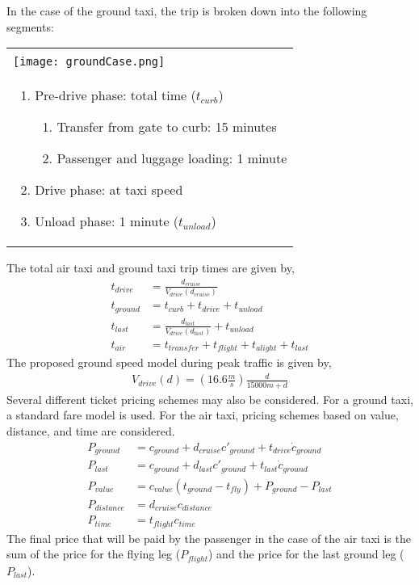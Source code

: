 \documentclass[12pt, letter]{article}
\begin{document}
\noindent In the case of the ground taxi, the trip is broken down into the following segments:
\begin{table}[H]
	\begin{tabular}{|p{5in}|}
	\hline
		\\\texttt{[image: groundCase.png]}\\
		\begin{enumerate}
			\item Pre-drive phase: total time ($t_{curb}$)
			\begin{enumerate}
			  \item Transfer from gate to curb: 15 minutes
				\item Passenger and luggage loading: 1 minute
			\end{enumerate}
			\item Drive phase: at taxi speed
			\item Unload phase: 1 minute ($t_{unload}$)
		\end{enumerate}
		\\ \hline
	\end{tabular}
\end{table}
\noindent The total air taxi and ground taxi trip times are given by,
\begin{align}
	t_{drive}&=\frac{d_{cruise}}{V_{drive}\left(d_{cruise}\right)}\\
	t_{ground}&=t_{curb}+t_{drive}+t_{unload}\\
	t_{last}&=\frac{d_{last}}{V_{drive}\left(d_{last}\right)}+t_{unload}\\
	t_{air}&=t_{transfer}+t_{flight}+t_{alight}+t_{last}
\end{align}
The proposed ground speed model during peak traffic is given by,
\begin{align}
	V_{drive}(d)=\left(16.6\frac{m}{s}\right)\frac{d}{15000m+d}
\end{align}
Several different ticket pricing schemes may also be considered. For a ground taxi, a standard fare model is used. For the air taxi, pricing schemes based on value, distance, and time are considered.
\begin{align}
	P_{ground}&=c_{ground}+d_{cruise} c'_{ground}+t_{drive} \dot{c}_{ground}\\
	P_{last}&=c_{ground}+d_{last} c'_{ground}+t_{last} \dot{c}_{ground}\\
	P_{value}&=c_{value}\left(t_{ground}-t_{fly}\right)+P_{ground}-P_{last}\\
	P_{distance}&=d_{cruise} c_{distance}\\
	P_{time}&=t_{flight} c_{time}
\end{align}
The final price that will be paid by the passenger in the case of the air taxi is the sum of the price for the flying leg ($P_{flight}$) and the price for the last ground leg ($P_{last}$).
\end{document}

